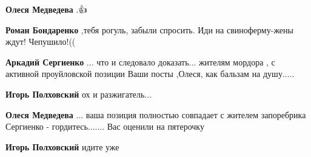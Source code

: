 \begin{itemize}
\begin{itemize}
\textbf{Олеся Медведева} .👍


 
\textbf{Роман Бондаренко} ,тебя рогуль, забыли спросить. Иди на свиноферму-жены ждут! Чепушило!((

 
\textbf{Аркадий Сергиенко} ... что и следовало доказать... жителям мордора , с
активной проуйловской позиции Ваши посты ,Олеся, как бальзам на душу.....

 
\textbf{Игорь Полховский} ох и разжигатель...

 
\textbf{Олеся Медведева} ... ваша позиция полностью совпадает с жителем запоребрика Сергиенко - гордитесь....... Вас оценили на пятерочку

 
\textbf{Игорь Полховский} идите уже

 

\end{itemize}
\end{itemize}
